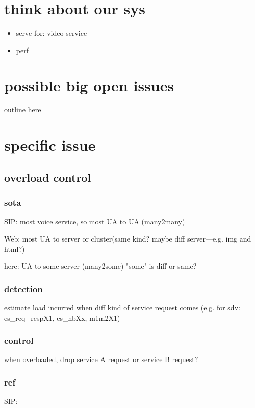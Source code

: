 \documentclass[•]{article}
\begin{document}
\section{think about our sys}
\begin{itemize}
\item serve for: video service
\end{itemize}

\begin{itemize}
\item perf
\subitem 
\end{itemize}


\section{possible big open issues}
outline here

\section{specific issue}

\subsection{overload control}

\subsubsection{sota}
SIP: most voice service, so most UA to UA (many2many)

Web: most UA to server or cluster(same kind? maybe diff server---e.g. img and html?)

here: UA to some server (many2some) "some" is diff or same?

\subsubsection{detection}
estimate load incurred when diff kind of service request comes
(e.g. for sdv: es\_req+respX1, es\_hbXx, m1m2X1)

\subsubsection{control}
when overloaded, drop service A request or service B request?


\subsubsection{ref}
SIP: \cite{Hilt2008}
\end{document}
